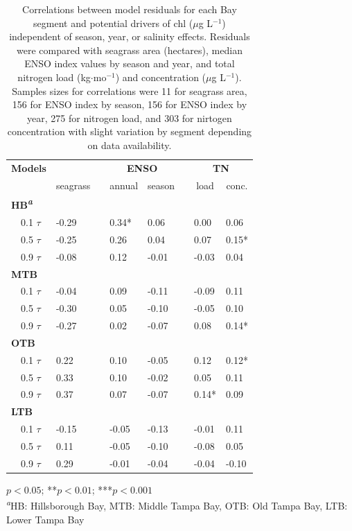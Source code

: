 \documentclass{svjour3}\usepackage[]{graphicx}\usepackage[]{color}
\newcommand{\mugl}{$\mu$g L$^{-1}$}
\begin{document}
\begin{table}[!tbp]
\caption{Correlations between model residuals for each Bay segment and potential drivers of \ac{chl} (\mugl) independent of season, year, or salinity effects. Residuals were compared with seagrass area (hectares), median ENSO index values by season and year, and total nitrogen load (kg$\cdot$mo$^{-1}$) and concentration (\mugl).  Samples sizes for correlations were 11 for seagrass area, 156 for ENSO index by season, 156 for ENSO index by year, 275 for nitrogen load, and 303 for nirtogen concentration with slight variation by segment depending on data availability.\label{tab:cormat}} 
\begin{center}
\begin{tabular}{llcllcll}
\hline\hline
\multicolumn{1}{l}{\bfseries Models}&\multicolumn{1}{c}{\bfseries }&\multicolumn{1}{c}{\bfseries }&\multicolumn{2}{c}{\bfseries ENSO}&\multicolumn{1}{c}{\bfseries }&\multicolumn{2}{c}{\bfseries TN}\tabularnewline
\cline{4-5} \cline{7-8}
\multicolumn{1}{l}{}&\multicolumn{1}{c}{seagrass}&\multicolumn{1}{c}{}&\multicolumn{1}{c}{annual}&\multicolumn{1}{c}{season}&\multicolumn{1}{c}{}&\multicolumn{1}{c}{load}&\multicolumn{1}{c}{conc.}\tabularnewline
\hline
{\bfseries HB\textsuperscript{\textit{a}}}&&&&&&&\tabularnewline
~~0.1 $\tau$&-0.29 &&0.34*&0.06 &&0.00 &0.06 \tabularnewline
~~0.5 $\tau$&-0.25 &&0.26 &0.04 &&0.07 &0.15*\tabularnewline
~~0.9 $\tau$&-0.08 &&0.12 &-0.01 &&-0.03 &0.04 \tabularnewline
\hline
{\bfseries MTB}&&&&&&&\tabularnewline
~~0.1 $\tau$&-0.04 &&0.09 &-0.11 &&-0.09 &0.11 \tabularnewline
~~0.5 $\tau$&-0.30 &&0.05 &-0.10 &&-0.05 &0.10 \tabularnewline
~~0.9 $\tau$&-0.27 &&0.02 &-0.07 &&0.08 &0.14*\tabularnewline
\hline
{\bfseries OTB}&&&&&&&\tabularnewline
~~0.1 $\tau$&0.22 &&0.10 &-0.05 &&0.12 &0.12*\tabularnewline
~~0.5 $\tau$&0.33 &&0.10 &-0.02 &&0.05 &0.11 \tabularnewline
~~0.9 $\tau$&0.37 &&0.07 &-0.07 &&0.14*&0.09 \tabularnewline
\hline
{\bfseries LTB}&&&&&&&\tabularnewline
~~0.1 $\tau$&-0.15 &&-0.05 &-0.13 &&-0.01 &0.11 \tabularnewline
~~0.5 $\tau$&0.11 &&-0.05 &-0.10 &&-0.08 &0.05 \tabularnewline
~~0.9 $\tau$&0.29 &&-0.01 &-0.04 &&-0.04 &-0.10 \tabularnewline
\hline
\end{tabular}\end{center}

\footnotesize *$p<0.05$; **$p<0.01$; ***$p<0.001$\\\textsuperscript{\textit{a}}HB: Hillsborough Bay, MTB: Middle Tampa Bay, OTB: Old Tampa Bay, LTB: Lower Tampa Bay\end{table}
\end{document}

